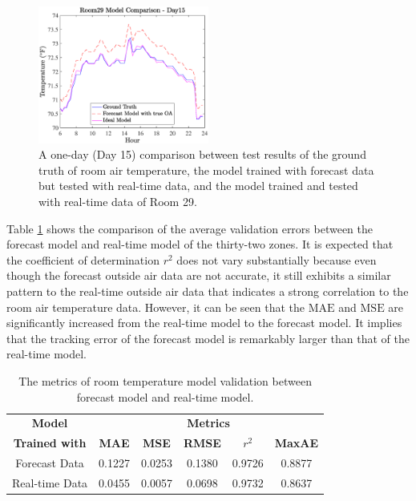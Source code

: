 \documentclass[conference]{IEEEtran}
\begin{document}
\begin{figure}[htbp]
\centerline{\includegraphics[width=0.5\textwidth]{Figures/three_models.eps}}
\caption{A one-day (Day 15) comparison between test results of the ground truth of room air temperature, the model trained with forecast data but tested with real-time data, and the model trained and tested with real-time data of Room 29.}
\label{figModel}
\end{figure}

Table \ref{tabModelDis} shows the comparison of the average validation errors between the forecast model and real-time model of the thirty-two zones. It is expected that the coefficient of determination $r^2$ does not vary substantially because even though the forecast outside air data are not accurate, it still exhibits a similar pattern to the real-time outside air data that indicates a strong correlation to the room air temperature data. However, it can be seen that the $\mathrm{MAE}$ and $\mathrm{MSE}$ are significantly increased from the real-time model to the forecast model. It implies that the tracking error of the forecast model is remarkably larger than that of the real-time model.

\begin{table}[htbp]
\caption{The metrics of room temperature model validation between forecast model and real-time model.}
\begin{center}
\begin{tabular}{|c|c|c|c|c|c|}
\hline
\textbf{Model} &\multicolumn{5}{|c|}{\textbf{Metrics}} \\
\cline{2-6} 
\textbf{Trained with}&\textbf{MAE} & \textbf{MSE} & \textbf{RMSE} & $r^2$ & \textbf{MaxAE} \\
\hline
Forecast Data & 0.1227  &  0.0253  &  0.1380 &   0.9726  &  0.8877
\\
Real-time Data & 0.0455  &  0.0057 &  0.0698 &  0.9732 &  0.8637 \\
\hline
\end{tabular}
\label{tabModelDis}
\end{center}
\end{table}
\end{document}
